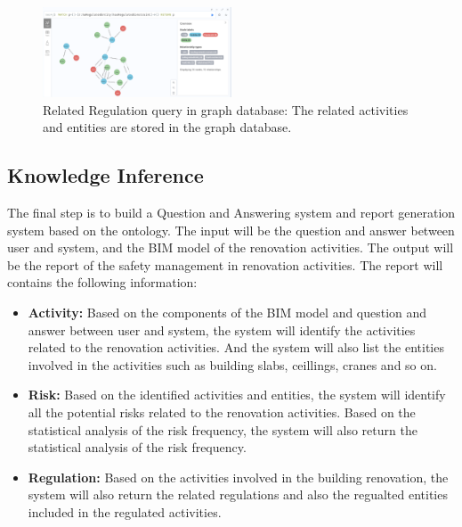 \begin{figure}
    \label{fig:related_regulation_query}
    \centering
    \includegraphics[width=0.5\textwidth]{figures/regulation relation.png}
    \caption{Related Regulation query in graph database: The related activities and entities are stored in the graph database.}
\end{figure}

\subsection*{Knowledge Inference}
\label{sec:knowledge_inference}
The final step is to build a Question and Answering system and report generation system based on the ontology.
The input will be the question and answer between user and system, and the BIM model of the renovation activities.
The output will be the report of the safety management in renovation activities. 
The report will contains the following information:
\begin{itemize}
   \item \textbf{Activity: } 
   Based on the components of the BIM model and question and answer between user and system,
    the system will identify the activities related to the renovation activities.
    And the system will also list the entities involved in the activities such as building slabs, ceillings, cranes and so on.
    \item \textbf{Risk: }
    Based on the identified activities and entities, the system will identify all the potential risks related to the renovation activities.
    Based on the statistical analysis of the risk frequency, the system will also return the statistical analysis of the risk frequency.
    \item \textbf{Regulation: }
    Based on the activities involved in the building renovation, the system will also return the related regulations
    and also the regualted entities included in the regulated activities. 
\end{itemize}

